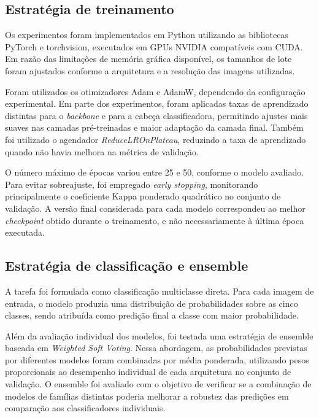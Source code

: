 \documentclass[conference]{IEEEtran}
\begin{document}
\subsection{Estratégia de treinamento}

Os experimentos foram implementados em Python utilizando as bibliotecas
PyTorch e torchvision, executados em GPUs NVIDIA compatíveis com CUDA.
Em razão das limitações de memória gráfica disponível,
os tamanhos de lote foram ajustados conforme a arquitetura e a
resolução das imagens utilizadas.

Foram utilizados os otimizadores Adam e AdamW, dependendo da
configuração experimental. Em parte dos experimentos, foram
aplicadas taxas de aprendizado distintas para o \textit{backbone} e
para a cabeça classificadora, permitindo ajustes mais suaves nas
camadas pré-treinadas e maior adaptação da camada final. Também
foi utilizado o agendador \textit{ReduceLROnPlateau}, reduzindo a taxa de
aprendizado quando não havia melhora na métrica de validação.

O número máximo de épocas variou entre 25 e 50, conforme o modelo
avaliado. Para evitar sobreajuste, foi empregado \textit{early stopping},
monitorando principalmente o coeficiente Kappa ponderado quadrático no
conjunto de validação. A versão final considerada para cada
modelo correspondeu ao melhor \textit{checkpoint} obtido durante o
treinamento, e não necessariamente à última época executada.

\subsection{Estratégia de classificação e ensemble}

A tarefa foi formulada como classificação multiclasse direta. Para
cada imagem de entrada, o modelo produzia uma distribuição de
probabilidades sobre as cinco classes, sendo atribuída como
predição final a classe com maior probabilidade.

Além da avaliação individual dos modelos, foi testada uma
estratégia de ensemble baseada em \textit{Weighted Soft Voting}. Nessa
abordagem, as probabilidades previstas por diferentes modelos foram
combinadas por média ponderada, utilizando pesos proporcionais ao
desempenho individual de cada arquitetura no conjunto de validação.
O ensemble foi avaliado com o objetivo de verificar se a combinação
de modelos de famílias distintas poderia melhorar a robustez das
predições em comparação aos classificadores individuais.
\end{document}
